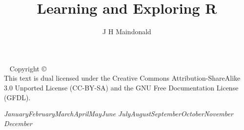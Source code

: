 \documentclass{tufte-book}\usepackage[]{graphicx}\usepackage[]{color}
\title{Learning and Exploring R}
\author[]{J H Maindonald}
\newcommand{\monthyear}{%
  \ifcase\month\or January\or February\or March\or April\or May\or June\or
  July\or August\or September\or October\or November\or
  December\fi\space\number\year
}
\newcommand{\blankpage}{\newpage\hbox{}\thispagestyle{empty}\newpage}
\begin{document}
\frontmatter




%

\setsidenotefont{\small}
\setcaptionfont{\small}
\setmarginnotefont{\small}

\BgThispage
\bmdefine{}
\bmdefine{}
\bmdefine{}


\maketitle

\newpage
\begin{fullwidth}
~\vfill
\thispagestyle{empty}
\setlength{\parindent}{0pt}
\setlength{\parskip}{\baselineskip}
Copyright \copyright\ \the\year\ \thanklessauthor\\
This text is dual licensed under the Creative Commons Attribution-ShareAlike 3.0 Unported License (CC-BY-SA) and the GNU Free Documentation License (GFDL). 



\par\textit{\monthyear}
\end{fullwidth}
\vfill
\end{document}
